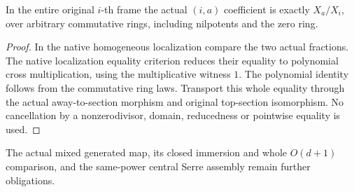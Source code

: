 \begin{lemma}
\label{lem:central-embedding-actual-mixed-coordinate-row-coefficients}
\leanok
In the entire original $i$-th frame the actual $(i,a)$ coefficient is exactly
$X_a/X_i$, over arbitrary commutative rings, including nilpotents and the zero ring.
\end{lemma}
\begin{proof}
In the native homogeneous localization compare the two actual fractions.
The native localization equality criterion reduces their equality to polynomial
cross multiplication, using the multiplicative witness $1$. The polynomial
identity follows from the commutative ring laws. Transport this whole equality
through the actual away-to-section morphism and original top-section isomorphism.
No cancellation by a nonzerodivisor, domain, reducedness or pointwise equality
is used.
\end{proof}
The actual mixed generated map, its closed immersion and whole $O(d+1)$
comparison, and the same-power central Serre assembly remain further obligations.
